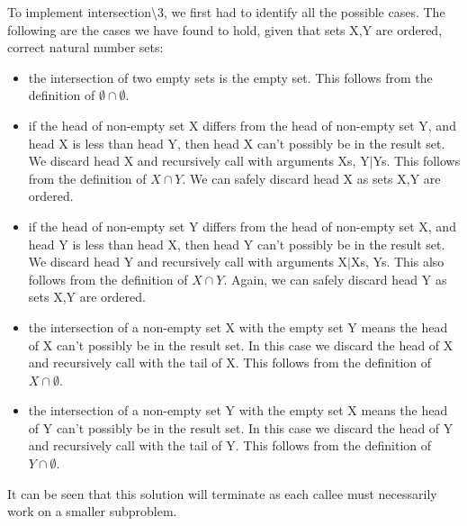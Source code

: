 \documentclass[]{article}
\begin{document}
To implement intersection\textbackslash3, we first had to identify all the possible cases. The following are the cases we have found to hold, given that sets X,Y are ordered, correct natural number sets:

\begin{itemize}
	\item the intersection of two empty sets is the empty set. This follows from the definition of $\emptyset \cap \emptyset$.
	\item if the head of non-empty set X differs from the head of non-empty set Y, and head X is less than head Y, then head X can't possibly be in the result set. We discard head X and recursively call with arguments Xs, Y$|$Ys. This follows from the definition of $X \cap Y$. We can safely discard head X as sets X,Y are ordered.
	\item if the head of non-empty set Y differs from the head of non-empty set X, and head Y is less than head X, then head Y can't possibly be in the result set. We discard head Y and recursively call with arguments X$|$Xs, Ys. This also follows from the definition of $X \cap Y$. Again, we can safely discard head Y as sets X,Y are ordered.
	\item the intersection of a non-empty set X with the empty set Y means the head of X can't possibly be in the result set. In this case we discard the head of X and recursively call with the tail of X. This follows from the definition of $X \cap \emptyset$.
	\item the intersection of a non-empty set Y with the empty set X means the head of Y can't possibly be in the result set. In this case we discard the head of Y and recursively call with the tail of Y. This follows from the definition of $Y \cap \emptyset$.

\end{itemize}

It can be seen that this solution will terminate as each callee must necessarily work on a smaller subproblem.\par

\end{document}
